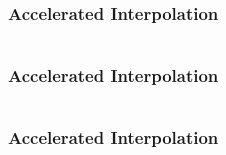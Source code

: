 \begin{frame}[t]
	\frametitle{Accelerated Interpolation}
	\begin{columns}
		\begin{column}{0.35\textwidth}
			\resizebox{0.8\textwidth}{!}{}
		\end{column}
		\begin{column}{0.55\textwidth}
			\resizebox{0.77\textwidth}{!}{}
		\end{column}
	\end{columns}
\end{frame}

\begin{frame}[t]
	\frametitle{Accelerated Interpolation}
	\begin{columns}
		\begin{column}{0.35\textwidth}
			\resizebox{0.8\textwidth}{!}{}
		\end{column}
		\begin{column}{0.55\textwidth}
			\resizebox{0.4\textwidth}{!}{}
		\end{column}
	\end{columns}
\end{frame}

\begin{frame}[t]
	\frametitle{Accelerated Interpolation}
	\begin{columns}
		\begin{column}{0.3\textwidth}
			\resizebox{0.8\textwidth}{!}{}
		\end{column}
		\begin{column}{0.35\textwidth}
				\resizebox{\textwidth}{!}{}
		\end{column}
		\begin{column}{0.3\textwidth}
				\onslide<9->{\resizebox{0.65\textwidth}{!}{}}
		\end{column}
	\end{columns}
	\begin{center}
	\end{center}
\end{frame}

